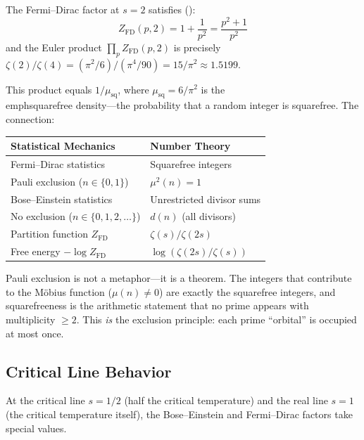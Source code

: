 \begin{correspondence}[Pauli Exclusion = Squarefree Density]
\label{corr:pauli-squarefree}
The Fermi--Dirac factor at $s = 2$ satisfies
():
\begin{equation}
  Z_{\mathrm{FD}}(p, 2) = 1 + \frac{1}{p^2} = \frac{p^2 + 1}{p^2}
  \label{eq:squarefree-fermi}
\end{equation}
and the Euler product $\prod_p Z_{\mathrm{FD}}(p, 2)$ is precisely
$\zeta(2)/\zeta(4) = (\pi^2/6)/(\pi^4/90) = 15/\pi^2 \approx 1.5199$.

This product equals $1/\mu_{\mathrm{sq}}$, where
$\mu_{\mathrm{sq}} = 6/\pi^2$ is the \\emph{squarefree density}---the
probability that a random integer is squarefree. The connection:
\begin{center}
\begin{tabular}{@{}ll@{}}
\toprule
\textbf{Statistical Mechanics} & \textbf{Number Theory} \\
\midrule
Fermi--Dirac statistics & Squarefree integers \\
Pauli exclusion ($n \in \{0,1\}$) & $\mu^2(n) = 1$ \\
Bose--Einstein statistics & Unrestricted divisor sums \\
No exclusion ($n \in \{0,1,2,\ldots\}$) & $d(n)$ (all divisors) \\
Partition function $Z_{\mathrm{FD}}$ & $\zeta(s)/\zeta(2s)$ \\
Free energy $-\log Z_{\mathrm{FD}}$ & $\log(\zeta(2s)/\zeta(s))$ \\
\bottomrule
\end{tabular}
\end{center}
Pauli exclusion is not a metaphor---it is a theorem. The integers that
contribute to the M\"obius function ($\mu(n) \neq 0$) are exactly the
squarefree integers, and squarefreeness is the arithmetic statement
that no prime appears with multiplicity $\geq 2$. This \emph{is}
the exclusion principle: each prime ``orbital'' is occupied at most once.
\end{correspondence}

\subsection{Critical Line Behavior}

At the critical line $s = 1/2$ (half the critical temperature) and
the real line $s = 1$ (the critical temperature itself), the
Bose--Einstein and Fermi--Dirac factors take special values.


